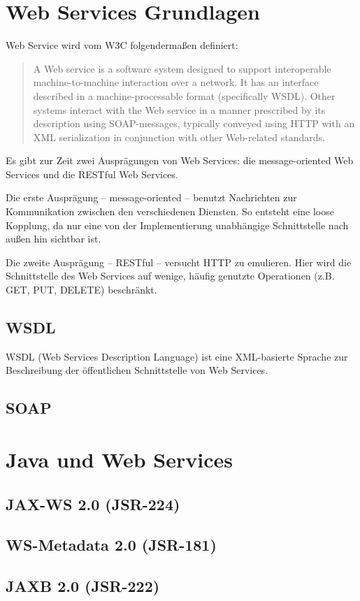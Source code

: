 \documentclass[runningheads]{llncs}
\begin{document}
  \section{Web Services Grundlagen}
  \nocite{wk_ws}
    \glqq{}Web Service\grqq{} wird vom W3C folgendermaßen definiert:
    \begin{quote}
      A Web service is a software system designed to support interoperable machine-to-machine interaction over a network. It has an interface described in a machine-processable format (specifically WSDL). Other systems interact with the Web service in a manner prescribed by its description using SOAP-messages, typically conveyed using HTTP with an XML serialization in conjunction with other Web-related standards.\cite{w3c_wsgloss_ws}
    \end{quote}

    Es gibt zur Zeit zwei Ausprägungen von Web Services: die \glqq{}message-oriented Web Services\grqq{} und die \glqq{}RESTful Web Services\grqq{}.

    Die erste Ausprägung -- message-oriented -- benutzt Nachrichten zur Kommunikation zwischen den verschiedenen Diensten. So entsteht eine loose Kopplung, da nur eine von der Implementierung unabhängige Schnittstelle nach außen hin sichtbar ist.

    Die zweite Ausprägung -- RESTful -- versucht HTTP zu emulieren. Hier wird die Schnittstelle des Web Services auf wenige, häufig genutzte Operationen (z.B. GET, PUT, DELETE) beschränkt.

  \subsection{WSDL}
  \nocite{wk_wsdl}
    WSDL (Web Services Description Language) ist eine XML-basierte Sprache zur Beschreibung der öffentlichen Schnittstelle von Web Services.

  \subsection{SOAP}
  \nocite{wk_soap}

  \section{Java und Web Services}

  \subsection{JAX-WS 2.0 (JSR-224)}
  \nocite{jsr_224}

  \subsection{WS-Metadata 2.0 (JSR-181)}
  \nocite{jsr_181}

  \subsection{JAXB 2.0 (JSR-222)}
  \nocite{jsr_222}

  \newpage
  
  
\end{document}

